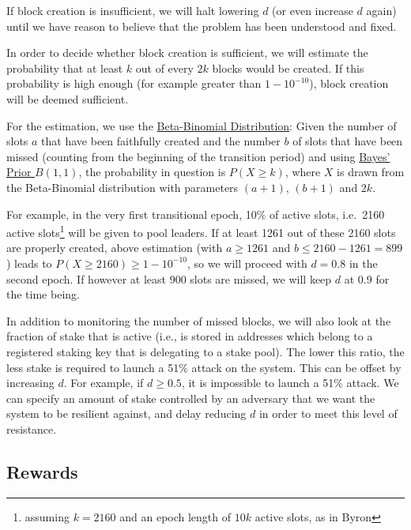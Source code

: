 \documentclass[11pt,a4paper,dvipsnames,twosided]{article}
\begin{document}
If block creation is insufficient, we will halt lowering \(d\) (or even
increase \(d\) again) until we have reason to believe that the problem
has been understood and fixed.

In order to decide whether block creation is sufficient, we will
estimate the probability that at least \(k\) out of every \(2k\) blocks
would be created. If this probability is high enough (for example
greater than \(1 - 10^{-10}\)), block creation will be deemed
sufficient.

For the estimation, we use the
\href{https://en.wikipedia.org/wiki/Beta-binomial_distribution}{Beta-Binomial
Distribution}: Given the number of slots \(a\) that have been faithfully
created and the number \(b\) of slots that have been missed (counting
from the beginning of the transition period) and using
\href{https://en.wikipedia.org/wiki/Beta_distribution\#Bayes'_prior_probability_(Beta(1,1))}{Bayes'
Prior \(B(1,1)\)}, the probability in question is \(P(X\geq k)\),
where \(X\) is drawn from the Beta-Binomial distribution with parameters
\((a + 1)\), \((b + 1)\) and \(2k\).

For example, in the very first transitional epoch, 10\% of active slots,
i.e.~2160 active slots\footnote{assuming \(k=2160\) and an epoch length of
  \(10k\) active slots, as in Byron} will be given to pool leaders. If at least
1261 out of these 2160 slots are properly created, above estimation (with
\(a\geq 1261\) and \(b\leq 2160-1261=899\)) leads to \(P(X\geq 2160)\geq
1-10^{-10}\), so we will proceed with \(d=0.8\) in the second epoch. If however
at least 900 slots are missed, we will keep \(d\) at \(0.9\) for the time being.

In addition to monitoring the number of missed blocks, we will also look
at the fraction of stake that is active (i.e., is stored in addresses
which belong to a registered staking key that is delegating to a stake
pool). The lower this ratio, the less stake is required to launch a 51\%
attack on the system. This can be offset by increasing \(d\). For
example, if \(d \geq 0.5\), it is impossible to launch a 51\% attack. We
can specify an amount of stake controlled by an adversary that we want
the system to be resilient against, and delay reducing \(d\) in order to
meet this level of resistance.

\subsection{Rewards}
\label{rewards}
\end{document}
